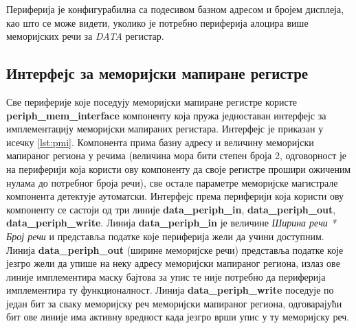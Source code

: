 Периферија је конфигурабилна са подесивом базном адресом и бројем дисплеја, као што се може видети, уколико је потребно периферија алоцира више меморијских речи за \textit{DATA} регистар.\newpage

\subsection{Интерфејс за меморијски мапиране регистре}

Све периферије које поседују меморијски мапиране регистре користе \textbf{periph\_mem\_interface} компоненту која пружа једноставан интерфејс за имплементацију меморијски мапираних регистара. Интерфејс је приказан у исечку \ref{lst:pmi}. Компонента прима базну адресу и величину меморијски мапираног региона у речима (величина мора бити  степен броја 2, одговорност је на периферији која користи ову компоненту да своје регистре прошири ожиченим нулама до потребног броја речи), све остале параметре меморијске магистрале компонента детектује аутоматски. Интерфејс према периферији која користи ову компоненту се састоји од три линије \textbf{data\_periph\_in}, \textbf{data\_periph\_out}, \textbf{data\_periph\_write}. Линија \textbf{data\_periph\_in} је величине \textit{Ширина речи * Број речи} и представља податке које периферија жели да учини доступним. Линија \textbf{data\_periph\_out} (ширине меморијске речи) представља податке које језгро жели да упише на неку адресу меморијски мапираног региона, излаз ове линије имплементира маску бајтова за упис те није потребно да периферија имплементира ту функционалност. Линија \textbf{data\_periph\_write} поседује по један бит за сваку меморијску реч меморијски мапираног региона, одговарајући бит ове линије има активну вредност када језгро врши упис у ту меморијску реч.


